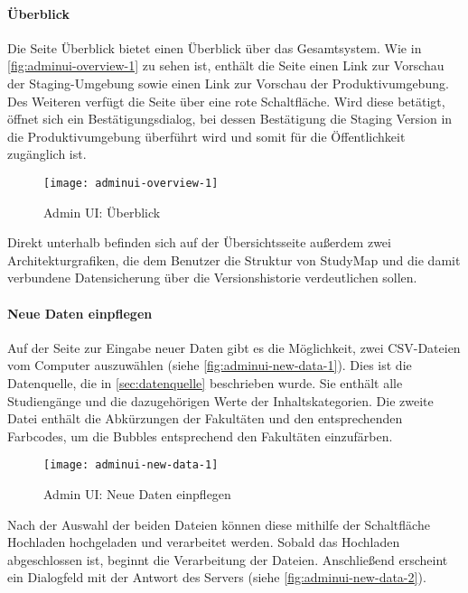 \paragraph*{Überblick}
Die Seite \glqq Überblick\grqq{} bietet einen Überblick über das Gesamtsystem. Wie in \autoref{fig:adminui-overview-1} zu sehen ist, enthält die Seite einen Link zur Vorschau der Staging-Umgebung sowie einen Link zur Vorschau der Produktivumgebung. Des Weiteren verfügt die Seite über eine rote Schaltfläche. Wird diese betätigt, öffnet sich ein Bestätigungsdialog, bei dessen Bestätigung die Staging Version in die Produktivumgebung überführt wird und somit für die Öffentlichkeit zugänglich ist.

\begin{figure}[H]
    \centering
    \texttt{[image: adminui-overview-1]}
    \caption{Admin UI: Überblick}
    \label{fig:adminui-overview-1}
\end{figure}

Direkt unterhalb befinden sich auf der Übersichtsseite außerdem zwei Architekturgrafiken, die dem Benutzer die Struktur von StudyMap und die damit verbundene Datensicherung über die Versionshistorie verdeutlichen sollen.

\paragraph*{Neue Daten einpflegen}
Auf der Seite zur Eingabe neuer Daten gibt es die Möglichkeit, zwei CSV-Dateien vom Computer auszuwählen (siehe \autoref{fig:adminui-new-data-1}). Dies ist die Datenquelle, die in \autoref{sec:datenquelle} beschrieben wurde. Sie enthält alle Studiengänge und die dazugehörigen Werte der Inhaltskategorien. Die zweite Datei enthält die Abkürzungen der Fakultäten und den entsprechenden Farbcodes, um die Bubbles entsprechend den Fakultäten einzufärben.

\begin{figure}[H]
    \centering
    \texttt{[image: adminui-new-data-1]}
    \caption{Admin UI: Neue Daten einpflegen}
    \label{fig:adminui-new-data-1}
\end{figure}

Nach der Auswahl der beiden Dateien können diese mithilfe der Schaltfläche \glqq Hochladen\grqq{} hochgeladen und verarbeitet werden. Sobald das Hochladen abgeschlossen ist, beginnt die Verarbeitung der Dateien. Anschließend erscheint ein Dialogfeld mit der Antwort des Servers (siehe \autoref{fig:adminui-new-data-2}).

